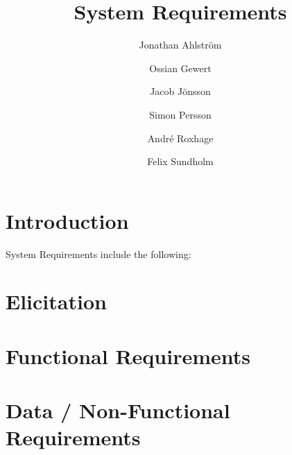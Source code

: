\documentclass[a4paper]{article}
\title{System Requirements}
\author{Jonathan Ahlström \and Ossian Gewert \and Jacob Jönsson \and Simon Persson \and André Roxhage \and Felix Sundholm}
\begin{document}
\maketitle

\begin{center}
    
\end{center}

\tableofcontents

\section{Introduction}
System Requirements include the following:

\section{Elicitation}


\section{Functional Requirements}


\section{Data / Non-Functional Requirements}

\end{document}
